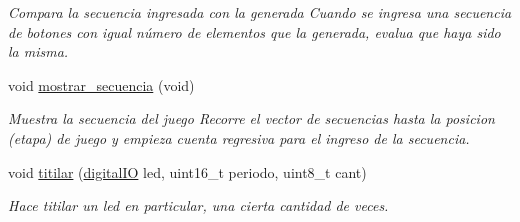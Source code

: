 \begin{DoxyCompactItemize}
\begin{DoxyCompactList}\small\item\em Compara la secuencia ingresada con la generada Cuando se ingresa una secuencia de botones con igual número de elementos que la generada, evalua que haya sido la misma. \end{DoxyCompactList}\item 
void \hyperlink{group__operaciones_gac7e841cdb7e274872e259c1b28c738b6}{mostrar\+\_\+secuencia} (void)\hypertarget{group__operaciones_gac7e841cdb7e274872e259c1b28c738b6}{}\label{group__operaciones_gac7e841cdb7e274872e259c1b28c738b6}

\begin{DoxyCompactList}\small\item\em Muestra la secuencia del juego Recorre el vector de secuencias hasta la posicion (etapa) de juego y empieza cuenta regresiva para el ingreso de la secuencia. \end{DoxyCompactList}\item 
void \hyperlink{group__operaciones_ga4238c37f1c597d470eb9840113652cff}{titilar} (\hyperlink{structdigital_i_o}{digital\+IO} led, uint16\+\_\+t periodo, uint8\+\_\+t cant)
\begin{DoxyCompactList}\small\item\em Hace titilar un led en particular, una cierta cantidad de veces. \end{DoxyCompactList}\end{DoxyCompactItemize}
